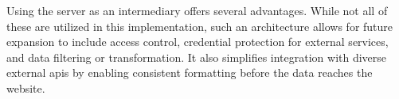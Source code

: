 Using the server as an intermediary offers several advantages. While not all of these are utilized in this implementation, such an architecture allows for future expansion to include access control, credential protection for external services, and data filtering or transformation. It also simplifies integration with diverse external \acrshort{api}s by enabling consistent formatting before the data reaches the website.

